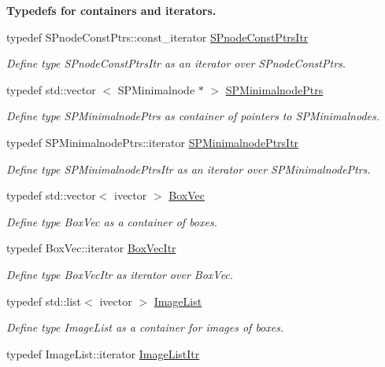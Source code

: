\begin{Indent}{\bf \-Typedefs for containers and iterators.}
\begin{DoxyCompactItemize}
typedef \*
\-S\-Pnode\-Const\-Ptrs\-::const\-\_\-iterator \hyperlink{namespacesubpavings_a4a185637f88fb7f6b082fca3a8d90537}{\-S\-Pnode\-Const\-Ptrs\-Itr}
\begin{DoxyCompactList}\small\item\em \-Define type \-S\-Pnode\-Const\-Ptrs\-Itr as an iterator over \-S\-Pnode\-Const\-Ptrs. \end{DoxyCompactList}\item 
typedef std\-::vector\*
$<$ \-S\-P\-Minimalnode $\ast$ $>$ \hyperlink{namespacesubpavings_ad21343865a1d93618e0fad6b4b08e53e}{\-S\-P\-Minimalnode\-Ptrs}
\begin{DoxyCompactList}\small\item\em \-Define type \-S\-P\-Minimalnode\-Ptrs as container of pointers to \-S\-P\-Minimalnodes. \end{DoxyCompactList}\item 
typedef \-S\-P\-Minimalnode\-Ptrs\-::iterator \hyperlink{namespacesubpavings_a0799ad5c6a6d3cd3b7afef68e5dfce51}{\-S\-P\-Minimalnode\-Ptrs\-Itr}
\begin{DoxyCompactList}\small\item\em \-Define type \-S\-P\-Minimalnode\-Ptrs\-Itr as an iterator over \-S\-P\-Minimalnode\-Ptrs. \end{DoxyCompactList}\item 
typedef std\-::vector$<$ ivector $>$ \hyperlink{namespacesubpavings_a322c2661740f6e6cc815fff0bfbd2623}{\-Box\-Vec}
\begin{DoxyCompactList}\small\item\em \-Define type \-Box\-Vec as a container of boxes. \end{DoxyCompactList}\item 
typedef \-Box\-Vec\-::iterator \hyperlink{namespacesubpavings_a8ea214a381f9c2027d0f605f2af25483}{\-Box\-Vec\-Itr}
\begin{DoxyCompactList}\small\item\em \-Define type \-Box\-Vec\-Itr as iterator over \-Box\-Vec. \end{DoxyCompactList}\item 
typedef std\-::list$<$ ivector $>$ \hyperlink{namespacesubpavings_acf161e8d79f04bf197a33277dd633f6d}{\-Image\-List}
\begin{DoxyCompactList}\small\item\em \-Define type \-Image\-List as a container for images of boxes. \end{DoxyCompactList}\item 
typedef \-Image\-List\-::iterator \hyperlink{namespacesubpavings_a8553bcc272ba9d0b7b9b6bd991b3bc00}{\-Image\-List\-Itr}

\end{DoxyCompactItemize}
\end{Indent}

